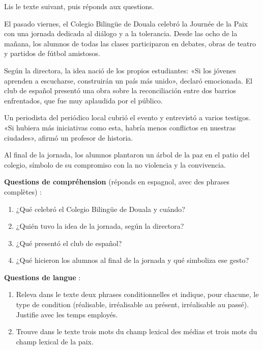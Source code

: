 \documentclass[11pt]{article}
\begin{document}
\begin{exercice}
Lis le texte suivant, puis réponds aux questions.

\begin{textebox}
El pasado viernes, el Colegio Bilingüe de Douala celebró la Journée de la Paix con una jornada dedicada al diálogo y a la tolerancia. Desde las ocho de la mañana, los alumnos de todas las clases participaron en debates, obras de teatro y partidos de fútbol amistosos.

Según la directora, la idea nació de los propios estudiantes: «Si los jóvenes aprenden a escucharse, construirán un país más unido», declaró emocionada. El club de español presentó una obra sobre la reconciliación entre dos barrios enfrentados, que fue muy aplaudida por el público.

Un periodista del periódico local cubrió el evento y entrevistó a varios testigos. «Si hubiera más iniciativas como esta, habría menos conflictos en nuestras ciudades», afirmó un profesor de historia.

Al final de la jornada, los alumnos plantaron un árbol de la paz en el patio del colegio, símbolo de su compromiso con la no violencia y la convivencia.
\end{textebox}

\textbf{Questions de compréhension} (réponds en espagnol, avec des phrases complètes) :
\begin{enumerate}
\item ¿Qué celebró el Colegio Bilingüe de Douala y cuándo?
\item ¿Quién tuvo la idea de la jornada, según la directora?
\item ¿Qué presentó el club de español?
\item ¿Qué hicieron los alumnos al final de la jornada y qué simboliza ese gesto?
\end{enumerate}

\textbf{Questions de langue} :
\begin{enumerate}
\item Releva dans le texte deux phrases conditionnelles et indique, pour chacune, le type de condition (réalisable, irréalisable au présent, irréalisable au passé). Justifie avec les temps employés.
\item Trouve dans le texte trois mots du champ lexical des médias et trois mots du champ lexical de la paix.
\end{enumerate}
\end{exercice}
\end{document}
